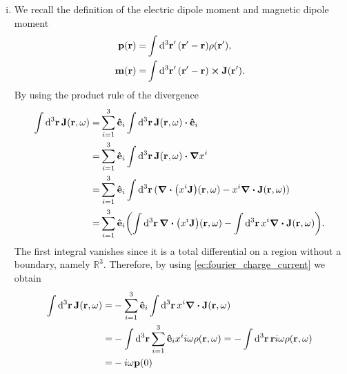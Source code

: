 \documentclass{article}
\begin{document}
\begin{enumerate}[(i)]
\item We recall the definition of the electric dipole moment and magnetic dipole moment
\begin{align}
\begin{split}
\vb{p}(\vb{r})=&\int\dd[3]{\vb{r}'}(\vb{r}'-\vb{r})\rho(\vb{r}'),\\
\vb{m}(\vb{r})=&\int\dd[3]{\vb{r}'}(\vb{r}'-\vb{r})\cross\vb{J}(\vb{r}').
\end{split}
\end{align}
By using the product rule of the divergence
\begin{align}
\begin{split}
\int\dd[3]{\vb{r}}\vb{J}(\vb{r},\omega)=&\sum_{i=1}^3\vu{e}_i\int\dd[3]{\vb{r}}\vb{J}(\vb{r},\omega)\vdot\vu{e}_{i}\\
=&\sum_{i=1}^3\vu{e}_i\int\dd[3]{\vb{r}}\vb{J}(\vb{r},\omega)\vdot\grad{x^i}\\
=&\sum_{i=1}^3\vu{e}_i\int\dd[3]{\vb{r}}(\div(x^i\vb{J})(\vb{r},\omega)-x^i\div{\vb{J}}(\vb{r},\omega))\\
=&\sum_{i=1}^3\vu{e}_i\qty(\int\dd[3]{\vb{r}}\div(x^i\vb{J})(\vb{r},\omega)-\int\dd[3]{\vb{r}}x^i\div{\vb{J}}(\vb{r},\omega)).
\end{split}
\end{align}
The first integral vanishes since it is a total differential on a region without a boundary, namely $\mathbb{R}^3$. Therefore, by using \eqref{ec:fourier_charge_current} we obtain
\begin{align}
\begin{split}
\int\dd[3]{\vb{r}}\vb{J}(\vb{r},\omega)=&-\sum_{i=1}^3\vu{e}_i\int\dd[3]{\vb{r}}x^i\div{\vb{J}}(\vb{r},\omega)\\
=&-\int\dd[3]{\vb{r}}\sum_{i=1}^3\vu{e}_ix^ii\omega\rho(\vb{r},\omega)=-\int\dd[3]{\vb{r}}\vb{r}i\omega\rho(\vb{r},\omega)\\
=&-i\omega\vb{p}(0)
\end{split}
\end{align}

\end{enumerate}
\end{document}

